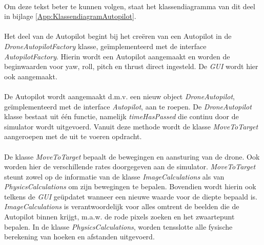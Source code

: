 \\
Om deze tekst beter te kunnen volgen, staat het klassendiagramma van dit deel in bijlage \ref{App:KlassendiagramAutopilot}.
\\
\\
Het deel van de Autopilot begint bij het cre\"eren van een Autopilot in de \textit{DroneAutopilotFactory} klasse, ge\"implementeerd met de interface \textit{AutopilotFactory}. Hierin wordt een Autopilot aangemaakt en worden de beginwaarden voor yaw, roll, pitch en thrust direct ingesteld. De \textit{GUI} wordt hier ook aangemaakt.
\\
\\
De Autopilot wordt aangemaakt d.m.v. een nieuw object \textit{DroneAutopilot}, ge\"implementeerd met de interface \textit{Autopilot}, aan te roepen. De \textit{DroneAutopilot} klasse bestaat uit één functie, namelijk \textit{timeHasPassed} die continu door de simulator wordt uitgevoerd. Vanuit deze methode wordt de klasse \textit{MoveToTarget} aangeroepen met de uit te voeren opdracht.
\\
\\
De klasse \textit{MoveToTarget} bepaalt de bewegingen en aansturing van de drone. Ook worden hier de verschillende rates doorgegeven aan de simulator. \textit{MoveToTarget} steunt zowel op de informatie van de klasse \textit{ImageCalculations} als van \textit{PhysicsCalculations} om zijn bewegingen te bepalen. Bovendien wordt hierin ook telkens de \textit{GUI} ge\"updatet wanneer een nieuwe waarde voor de diepte bepaald is.
\\
\textit{ImageCalculations} is verantwoordelijk voor alles omtrent de beelden die de Autopilot binnen krijgt, m.a.w. de rode pixels zoeken en het zwaartepunt bepalen.
In de klasse \textit{PhysicsCalculations}, worden tensslotte alle fysische berekening van hoeken en afstanden uitgevoerd.